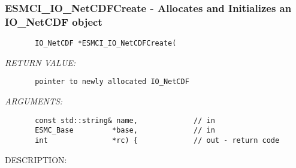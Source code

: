  
\setlength{\oldparskip}{\parskip}
\setlength{\parskip}{1.5ex}
\setlength{\oldparindent}{\parindent}
\setlength{\parindent}{0pt}
\setlength{\oldbaselineskip}{\baselineskip}
\setlength{\baselineskip}{11pt}
 
\def\bv{\begin{verbatim}}
\def\ev{\end{verbatim}}
\def\be{\begin{equation}}
\def\ee{\end{equation}}
\def\bea{\begin{eqnarray}}
\def\eea{\end{eqnarray}}
\def\bi{\begin{itemize}}
\def\ei{\end{itemize}}
\def\bn{\begin{enumerate}}
\def\en{\end{enumerate}}
\def\bd{\begin{description}}
\def\ed{\end{description}}
\def\({\left (}
\def\){\right )}
\def\[{\left [}
\def\]{\right ]}
\def\<{\left  \langle}
\def\>{\right \rangle}
\def\cI{{\cal I}}
\def\diag{\mathop{\rm diag}}
\def\tr{\mathop{\rm tr}}


 
\subsubsection [ESMCI\_IO\_NetCDFCreate] {ESMCI\_IO\_NetCDFCreate - Allocates and Initializes an IO\_NetCDF object}


  
\begin{verbatim}       IO_NetCDF *ESMCI_IO_NetCDFCreate(\end{verbatim}{\em RETURN VALUE:}
\begin{verbatim}       pointer to newly allocated IO_NetCDF\end{verbatim}{\em ARGUMENTS:}
\begin{verbatim}       const std::string& name,             // in
       ESMC_Base         *base,             // in
       int               *rc) {             // out - return code
 \end{verbatim}
{\sf DESCRIPTION:\\ }


